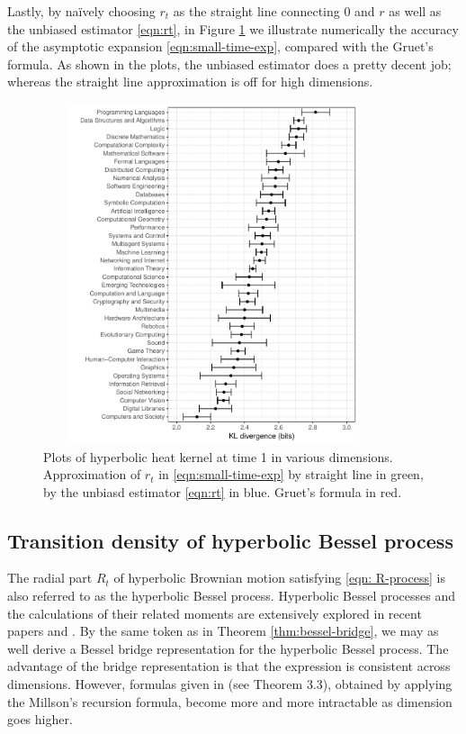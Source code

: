 \documentclass[12pt, reqno]{amsart}
\numberwithin{equation}{section}
\begin{document}
Lastly, by na\"ively choosing $r_t$ as the straight line connecting 0 and $r$ as well as the unbiased estimator \eqref{eqn:rt}, in Figure \ref{fig:fig1} we illustrate numerically the accuracy of the asymptotic expansion \eqref{eqn:small-time-exp}, compared with the Gruet's formula. As shown in the plots, the unbiased estimator does a pretty decent job; whereas the straight line approximation is off for high dimensions. 
\begin{figure}[ht!]
\begin{center}
\includegraphics[width=10cm, height=10cm]{Fig1.pdf} 
\end{center}
\caption{Plots of hyperbolic heat kernel at time 1 in various dimensions. Approximation of $r_t$ in \eqref{eqn:small-time-exp} by straight line in green, by the unbiasd estimator \eqref{eqn:rt} in blue. Gruet's formula in red.}
\label{fig:fig1}
\end{figure}

\subsection{Transition density of hyperbolic Bessel process}
The radial part $R_t$ of hyperbolic Brownian motion satisfying \eqref{eqn: R-process} is also referred to as the hyperbolic Bessel process. Hyperbolic Bessel processes and the calculations of their related moments are extensively explored in recent papers \cite{j-w} and \cite{pyc-zak}. 
By the same token as in Theorem \ref{thm:bessel-bridge}, we may as well derive a Bessel bridge representation for the hyperbolic Bessel process. The advantage of the bridge representation is that the expression is consistent across dimensions. However, formulas given in \cite{pyc-zak} (see Theorem 3.3), obtained by applying the Millson's recursion formula, become more and more intractable as dimension goes higher. 
\end{document}
